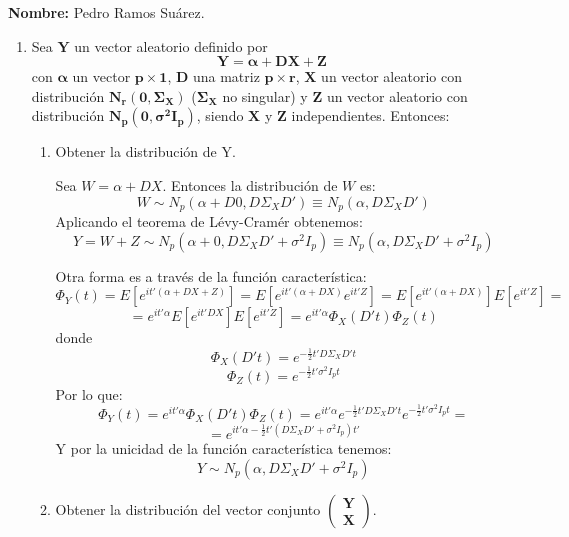 \documentclass[11pt,a4paper]{article}
\begin{document}

\textbf{Nombre:} Pedro Ramos Suárez.

\begin{enumerate}[label=\arabic*.]
\bfseries
\item Sea $\mathbf{Y}$ un vector aleatorio definido por
$$\mathbf{Y = \alpha + DX + Z}$$
con $\mathbf{\alpha}$ un vector $\mathbf{p \times 1}$, $\mathbf{D}$ una matriz $\mathbf{p \times r}$, $\mathbf{X}$ un vector aleatorio con distribución $\mathbf{N_{r}(0, \Sigma_{X})}$ ($\mathbf{\Sigma_{X}}$ no singular) y $\mathbf{Z}$ un vector aleatorio con distribución $\mathbf{N_{p}(0, \sigma^{2}I_{p})}$, siendo $\mathbf{X}$ y $\mathbf{Z}$ independientes. Entonces:
\begin{enumerate}[label=\alph*)]
\item Obtener la distribución de Y.
\vspace{0.5cm}
\normalfont

Sea $W = \alpha + DX$. Entonces la distribución de $W$ es:
$$W \sim N_{p}(\alpha + D0, D\Sigma_{X}D') \equiv N_{p}(\alpha, D\Sigma_{X}D')$$
Aplicando el teorema de Lévy-Cramér obtenemos:
$$Y = W + Z \sim N_{p}(\alpha + 0, D\Sigma_{X}D' + \sigma^{2}I_{p}) \equiv N_{p}(\alpha, D\Sigma_{X}D' + \sigma^{2}I_{p})$$

\vspace{0.5cm}

Otra forma es a través de la función característica:
$$\Phi_{Y}(t) = E[e^{it'(\alpha + DX + Z)}] = E[e^{it'(\alpha+DX)}e^{it'Z}] = E[e^{it'(\alpha+DX)}]E[e^{it'Z}] =$$
$$= e^{it'\alpha}E[e^{it'DX}]E[e^{it'Z}] = e^{it'\alpha}\Phi_{X}(D't)\Phi_{Z}(t)$$
donde
$$\Phi_{X}(D't) = e^{-\frac{1}{2}t'D\Sigma_{X}D't}$$
$$\Phi_{Z}(t) = e^{-\frac{1}{2}t'\sigma^{2}I_{p}t}$$
Por lo que:
$$\Phi_{Y}(t) = e^{it'\alpha}\Phi_{X}(D't)\Phi_{Z}(t) = e^{it'\alpha}e^{-\frac{1}{2}t'D\Sigma_{X}D't}e^{-\frac{1}{2}t'\sigma^{2}I_{p}t} =$$
$$= e^{it'\alpha - \frac{1}{2}t'(D\Sigma_{X}D' + \sigma^{2}I_{p})t'}$$
Y por la unicidad de la función característica tenemos:
$$Y \sim N_{p}(\alpha, D\Sigma_{X}D' + \sigma^{2}I_{p})$$

\vspace{1cm}
\bfseries
\item Obtener la distribución del vector conjunto $\mathbf{\begin{pmatrix} Y \\ X \end{pmatrix}}$.
\vspace{0.5cm}
\normalfont


\end{enumerate}
\end{enumerate}
\end{document}
